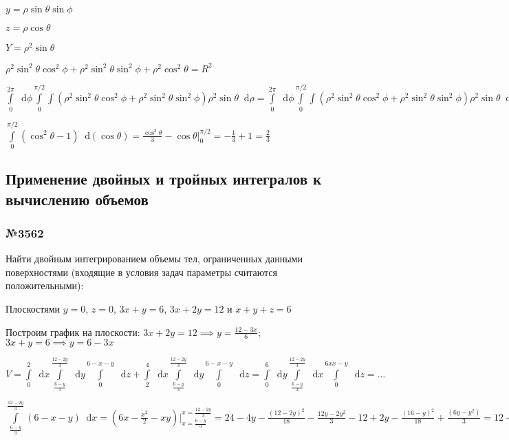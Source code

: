 \documentclass{article}
\newcommand*\diff{\mathop{}\!\mathrm{d}}
\begin{document}
$y = \rho \sin \theta \sin \phi$

$z = \rho \cos \theta$

$Y = \rho^2 \sin \theta$

$\rho^2 \sin^2 \theta \cos^2 \phi + \rho^2 \sin^2 \theta \sin^2 \phi + \rho^2 \cos^2 \theta = R^2$

$\int\limits_{0}^{2 \pi} \diff \phi \int\limits_{0}^{\pi/2} \int (\rho^2 \sin^2 \theta \cos^2 \phi + \rho^2 \sin^2 \theta \sin^2 \phi) \rho^2 \sin \theta \diff \rho =
\int\limits_{0}^{2 \pi} \diff \phi \int\limits_{0}^{\pi/2} \int (\rho^2 \sin^2 \theta \cos^2 \phi + \rho^2 \sin^2 \theta \sin^2 \phi) \rho^2 \sin \theta  \diff \rho = \int\limits_{0}^{2\pi} \diff \phi \int\limits_{0}^{\pi/2} \sin^2 \theta \sin \theta \diff \theta \int\limits_{0}^{R} \rho^4 \diff \rho$

$\int\limits_{0}^{\pi/2} (\cos^2 \theta - 1) \diff (\cos \theta) = \frac{\cos^3 \theta}{3} - \cos \theta \bigg|_{0}^{\pi/2} = -\frac{1}{3} + 1 =  \frac{2}{3}$

\pagebreak
\subsection{Применение двойных и тройных интегралов к вычислению объемов}

\subsubsection{№3562}

Найти двойным интегрированием объемы тел, ограниченных данными поверхностями (входящие в условия задач параметры считаются положительными):

Плоскостями $y = 0$, $z = 0$, $3x + y = 6$, $3x + 2y = 12$ и $x + y + z = 6$

Построим график на плоскости: $3x + 2y = 12 \implies y = \frac{12 - 3x}{6}$; $3x + y = 6 \implies y = 6 - 3x$

$V = \int\limits_{0}^{2} \diff x \int\limits_{\frac{6-y}{3}}^{\frac{12-2y}{3}} \diff y \int\limits_{0}^{6-x-y} \diff z + \int\limits_{2}^{4} \diff x \int\limits_{\frac{6-y}{3}}^{\frac{12-2y}{3}} \diff y \int\limits_{0}^{6-x-y} \diff z = \int\limits_{0}^{6} \diff y \int\limits_{\frac{6-y}{3}}^{\frac{12-2y}{3}} \diff x \int\limits_{0}^{6xx-y} \diff z = \dots$

$\int\limits_{\frac{6-y}{3}}^{\frac{12-2y}{3}} (6-x-y) \diff x = (6x - \frac{x^2}{2} - xy) \bigg|_{x=\frac{6-y}{3}}^{x=\frac{12-2y}{3}} = 24 - 4y - \frac{(12-2y)^2}{18} - \frac{12y-2y^2}{3} - 12 + 2y - \frac{(16-y)^2}{18} + \frac{(6y-y^2)}{3} = 12 - 2y-\frac{(12-2y)^2+(6-y)^2}{18} - \frac{12y-2y^2+6y-y^2}{3} = 12-2y-\frac{180-60y+5y^2}{18} - \frac{18y-34}{3} = \frac{216-36y-180+60y-5y^2-108y+18y^2}{18}$
\end{document}

